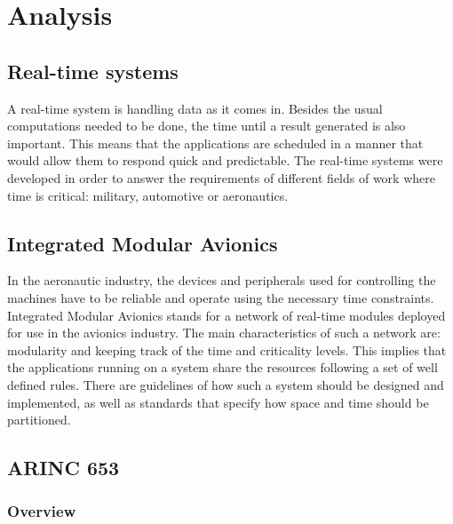 
\newcommand{\arinc}{ARINC 653}

\chapter{Analysis}


\section{Real-time systems}
A real-time system is handling data as it comes in.
Besides the usual computations needed to be done,
the time until a result generated is also important.
This means that the applications are scheduled in a manner that would allow them to respond quick and predictable.
The real-time systems were developed in order to answer the requirements of different fields of work
where time is critical: military, automotive or aeronautics.


\section{Integrated Modular Avionics}
In the aeronautic industry, the devices and peripherals used for controlling the machines have to be reliable and operate using the necessary time constraints. Integrated Modular Avionics stands for
a network of real-time modules deployed for use in the avionics industry.
The main characteristics of such a network are: modularity and keeping track of the time and criticality levels.
This implies that the applications running on a system share the resources following a set of well defined rules.
There are guidelines of how such a system should be designed and implemented,
as well as standards that specify how space and time should be partitioned.


\section{ARINC 653}

\subsection{Overview}

